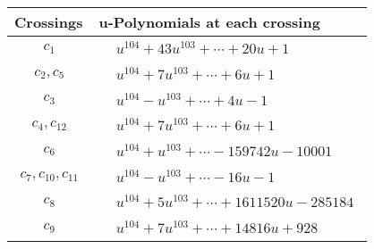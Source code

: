 \documentclass[1p]{elsarticle_modified}
\theoremstyle{definition}
\begin{document}
\begin{tabular}{m{50pt}|m{274pt}}
Crossings & \hspace{64pt}u-Polynomials at each crossing \\
\hline $$\begin{aligned}c_{1}\end{aligned}$$&$\begin{aligned}
&u^{104}+43 u^{103}+\cdots+20 u+1
\end{aligned}$\\
\hline $$\begin{aligned}c_{2},c_{5}\end{aligned}$$&$\begin{aligned}
&u^{104}+7 u^{103}+\cdots+6 u+1
\end{aligned}$\\
\hline $$\begin{aligned}c_{3}\end{aligned}$$&$\begin{aligned}
&u^{104}- u^{103}+\cdots+4 u-1
\end{aligned}$\\
\hline $$\begin{aligned}c_{4},c_{12}\end{aligned}$$&$\begin{aligned}
&u^{104}+7 u^{103}+\cdots+6 u+1
\end{aligned}$\\
\hline $$\begin{aligned}c_{6}\end{aligned}$$&$\begin{aligned}
&u^{104}+u^{103}+\cdots-159742 u-10001
\end{aligned}$\\
\hline $$\begin{aligned}c_{7},c_{10},c_{11}\end{aligned}$$&$\begin{aligned}
&u^{104}- u^{103}+\cdots-16 u-1
\end{aligned}$\\
\hline $$\begin{aligned}c_{8}\end{aligned}$$&$\begin{aligned}
&u^{104}+5 u^{103}+\cdots+1611520 u-285184
\end{aligned}$\\
\hline $$\begin{aligned}c_{9}\end{aligned}$$&$\begin{aligned}
&u^{104}+7 u^{103}+\cdots+14816 u+928
\end{aligned}$\\
\hline
\end{tabular}\\~\\
\end{document}
